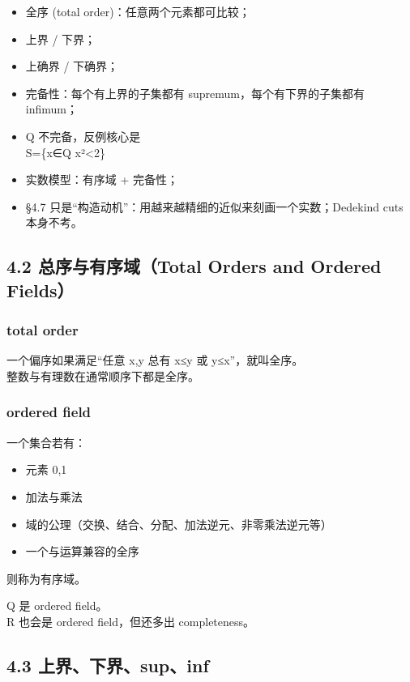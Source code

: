 \documentclass[
  11pt,
]{article}
\providecommand{\tightlist}{%
  \setlength{\itemsep}{0pt}\setlength{\parskip}{0pt}}
\begin{document}
\begin{itemize}
\tightlist
\item
  全序 (total order)：任意两个元素都可比较；
\item
  上界 / 下界；
\item
  上确界 / 下确界；
\item
  完备性：每个有上界的子集都有 supremum，每个有下界的子集都有 infimum；
\item
  Q 不完备，反例核心是\\
  S=\{x∈Q \textbar{} x²\textless2\}
\item
  实数模型：有序域 + 完备性；
\item
  §4.7 只是``构造动机''：用越来越精细的近似来刻画一个实数；Dedekind cuts
  本身不考。
\end{itemize}

\subsection{4.2 总序与有序域（Total Orders and Ordered
Fields）}\label{ux603bux5e8fux4e0eux6709ux5e8fux57dftotal-orders-and-ordered-fields}

\subsubsection{total order}\label{total-order}

一个偏序如果满足``任意 x,y 总有 x≤y 或 y≤x''，就叫全序。\\
整数与有理数在通常顺序下都是全序。

\subsubsection{ordered field}\label{ordered-field}

一个集合若有：

\begin{itemize}
\tightlist
\item
  元素 0,1
\item
  加法与乘法
\item
  域的公理（交换、结合、分配、加法逆元、非零乘法逆元等）
\item
  一个与运算兼容的全序
\end{itemize}

则称为有序域。

Q 是 ordered field。\\
R 也会是 ordered field，但还多出 completeness。

\subsection{4.3
上界、下界、sup、inf}\label{ux4e0aux754cux4e0bux754csupinf}
\end{document}
